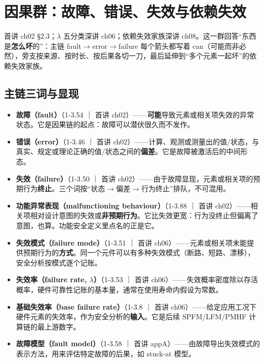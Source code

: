 \section{因果群：故障、错误、失效与依赖失效}

\begin{noteblock}
首讲 ch02 §2.3；\(\lambda\) 五分类深讲 ch06；依赖失效家族深讲 ch08。这一群回答“东西是\textbf{怎么坏}的”：主链 fault\(\rightarrow\)error\(\rightarrow\)failure 每个箭头都写着 can（可能而非必然），旁支按来源、按时长、按后果各切一刀，最后延伸到“多个元素一起坏”的依赖失效家族。
\end{noteblock}

\subsection{主链三词与显现}

\begin{itemize}
\item \textbf{故障（fault）}（1-3.54 ｜ 首讲 ch02）——\textbf{可能}导致元素或相关项失效的异常状态。它是因果链的起点：故障可以潜伏很久而不发作。
\item \textbf{错误（error）}（1-3.46 ｜ 首讲 ch02）——计算、观测或测量出的值/状态，与真实、规定或理论正确的值/状态之间的\textbf{偏差}。它是故障被激活后的中间形态。
\item \textbf{失效（failure）}（1-3.50 ｜ 首讲 ch02）——由于故障显现，元素或相关项的预期行为\textbf{终止}。三个词按“状态\(\rightarrow\)偏差\(\rightarrow\)行为终止”排队，不可混用。
\item \textbf{功能异常表现（malfunctioning behaviour）}（1-3.88 ｜ 首讲 ch02）——相关项相对设计意图的失效或\textbf{非预期行为}。它比失效更宽：行为没终止但偏离了意图，也算。功能安全定义里点名的正是它。
\item \textbf{失效模式（failure mode）}（1-3.51 ｜ 首讲 ch06）——元素或相关项未能提供预期行为的\textbf{方式}。同一个元件可以有多种失效模式（断路、短路、漂移），安全分析按模式逐个记账。
\item \textbf{失效率（failure rate, \(\lambda\)）}（1-3.53 ｜ 首讲 ch06）——失效概率密度除以存活概率，硬件可靠性记账的基本量，通常在使用寿命内假设为常数。
\item \textbf{基础失效率（base failure rate）}（1-3.8 ｜ 首讲 ch06）——给定应用工况下硬件元素的失效率，作为安全分析的\textbf{输入}。它是后续 SPFM/LFM/PMHF 计算链的最上游数字。
\item \textbf{故障模型（fault model）}（1-3.58 ｜ 首讲 appA）——由故障导出失效模式的表示方法，用来评估特定故障的后果，如 stuck-at 模型。
\end{itemize}

